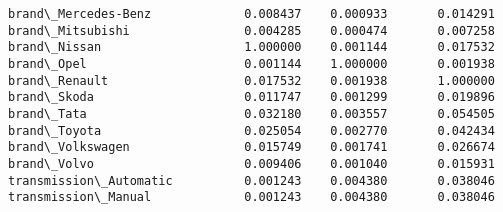 \documentclass[11pt]{article}
\begin{document}
\begin{tcolorbox}[breakable, size=fbox, boxrule=.5pt, pad at break*=1mm, opacityfill=0]
\begin{Verbatim}[commandchars=\\\{\}]
brand\_Mercedes-Benz             0.008437    0.000933       0.014291
brand\_Mitsubishi                0.004285    0.000474       0.007258
brand\_Nissan                    1.000000    0.001144       0.017532
brand\_Opel                      0.001144    1.000000       0.001938
brand\_Renault                   0.017532    0.001938       1.000000
brand\_Skoda                     0.011747    0.001299       0.019896
brand\_Tata                      0.032180    0.003557       0.054505
brand\_Toyota                    0.025054    0.002770       0.042434
brand\_Volkswagen                0.015749    0.001741       0.026674
brand\_Volvo                     0.009406    0.001040       0.015931
transmission\_Automatic          0.001243    0.004380       0.038046
transmission\_Manual             0.001243    0.004380       0.038046


\end{Verbatim}
\end{tcolorbox}
\end{document}

